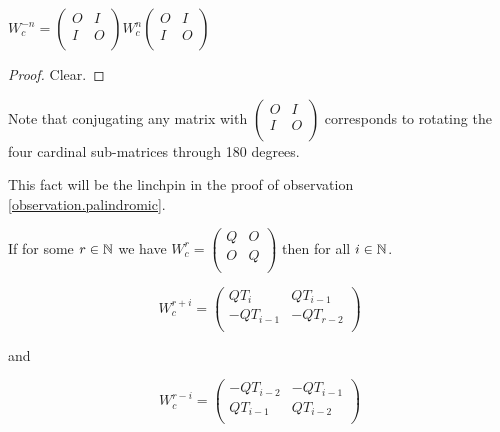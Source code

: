 \begin{corollary}
  $W_{c}^{-n} =
  \left(\begin{smallmatrix} O & I \\ I & O \\\end{smallmatrix}\right)
  W_{c}^{n}
  \left(\begin{smallmatrix} O & I \\ I & O \\\end{smallmatrix}\right)$
\end{corollary}

\begin{proof}
  Clear.
\end{proof}

Note that conjugating any matrix with
$\left(\begin{smallmatrix} O & I \\ I & O \\\end{smallmatrix}\right)$ 
corresponds to rotating the four cardinal sub-matrices through 180 degrees.

This fact will be the linchpin in the proof of observation
\ref{observation.palindromic}.

\begin{lemma}
  If for some $r\in\mathbb{N}$ we have $W_{c}^{r} = \left(\begin{smallmatrix} Q & O \\ O & Q \\\end{smallmatrix}\right)$ then for all $i\in\mathbb{N}$.

  \[
  W_{c}^{r+i} = \left(\begin{array}{cc} QT_{i} & QT_{i-1} \\ -QT_{i-1} & -QT_{r-2} \\\end{array}\right)
  \]

  and

  \[
  W_{c}^{r-i} = \left(\begin{array}{cc} -QT_{i-2} & -QT_{i-1} \\ QT_{i-1} & QT_{i-2} \\\end{array}\right)
  \]
\end{lemma}


